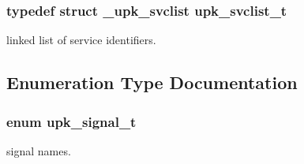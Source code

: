 \subsubsection{\setlength{\rightskip}{0pt plus 5cm}typedef struct \bf{\_\-upk\_\-svclist} \bf{upk\_\-svclist\_\-t}}\label{types_8h_6128339e81e4aa9a8ba5b599c0551e36}


linked list of service identifiers. 



\subsection{Enumeration Type Documentation}
\subsubsection{\setlength{\rightskip}{0pt plus 5cm}enum \bf{upk\_\-signal\_\-t}}\label{types_8h_38ab6e8dbcbb74880d189479e6a95b12}


signal names. 

